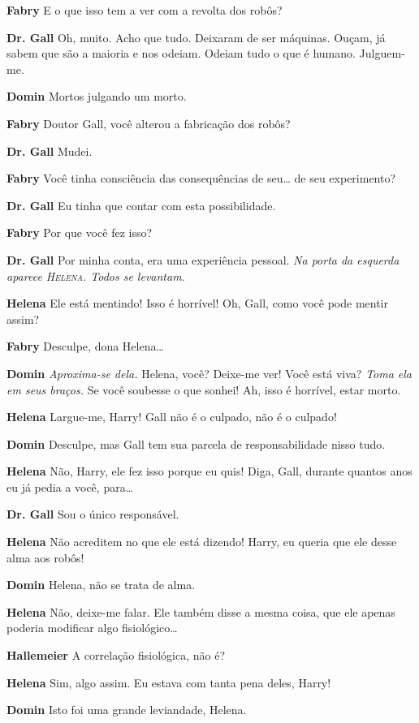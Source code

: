 \textbf{Fabry} E o que isso tem a ver com a revolta dos robôs?

\textbf{Dr. Gall} Oh, muito. Acho que tudo. Deixaram de ser máquinas. Ouçam, já sabem que
são a maioria e nos odeiam. Odeiam tudo o que é humano. Julguem-me.

\textbf{Domin} Mortos julgando um morto.

\textbf{Fabry} Doutor Gall, você alterou a fabricação dos robôs?

\textbf{Dr. Gall} Mudei.

\textbf{Fabry} Você tinha consciência das consequências de seu\ldots{} de seu
experimento?

\textbf{Dr. Gall} Eu tinha que contar com esta possibilidade.

\textbf{Fabry} Por que você fez isso? 

\textbf{Dr. Gall} Por minha conta, era uma experiência pessoal.
\emph{Na porta da esquerda aparece \textsc{Helena}. Todos se levantam.}

\textbf{Helena} Ele está mentindo! Isso é horrível! Oh, Gall, como você pode mentir assim?

\textbf{Fabry} Desculpe, dona Helena\ldots{}

\textbf{Domin} \emph{Aproxima-se dela.} Helena, você? Deixe-me ver! Você está viva?
\emph{Toma ela em seus braços.} Se você soubesse o que sonhei! Ah, isso é horrível,
estar morto.

\textbf{Helena} Largue-me, Harry! Gall não é o culpado, não é o culpado!

\textbf{Domin} Desculpe, mas Gall tem sua parcela de responsabilidade nisso tudo.

\textbf{Helena} Não, Harry, ele fez isso porque eu quis! Diga, Gall, durante quantos
anos eu já pedia a você, para\ldots{}

\textbf{Dr. Gall} Sou o único responsável.

\textbf{Helena} Não acreditem no que ele está dizendo! Harry, eu queria que ele desse
alma aos robôs!

\textbf{Domin} Helena, não se trata de alma.

\textbf{Helena} Não, deixe-me falar. Ele também disse a mesma coisa, que ele apenas
poderia modificar algo fisiológico\ldots{}

\textbf{Hallemeier} A correlação fisiológica, não é?

\textbf{Helena} Sim, algo assim. Eu estava com tanta pena deles, Harry!

\textbf{Domin} Isto foi uma grande leviandade, Helena.

